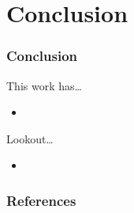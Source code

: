 \documentclass[handout,10pt]{beamer}%
\begin{document}
	\section{Conclusion}

	\begin{frame}
		\frametitle{Conclusion}
		
		This work has\ldots
		\begin{itemize}
			\item 
		\end{itemize}
		Lookout\ldots
		\begin{itemize}
		\item 
		\end{itemize}
	
	\end{frame}

	\begin{frame}
		\frametitle{References}
		
		\tiny
		
		
	\end{frame}
\end{document}
